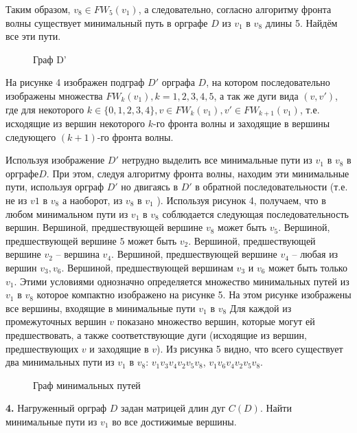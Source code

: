\documentclass[12pt, letterpaper, titlepage]{article}
\begin{document}
Таким образом, $v_8 \in FW_5(v_1)$, а следовательно, согласно алгоритму фронта волны существует минимальный
путь в орграфе $D$ из $v_1$ в $v_8$ длины 5. Найдём все эти пути.
\begin{figure}[H]\centering\caption{Граф D'}\end{figure}
На рисунке 4 изображен подграф $D'$ орграфа $D$, на котором последовательно изображены множества
$FW_k(v_1), k=1,2,3,4,5$, а так же  дуги вида $(v, v')$, где для некоторого $k \in \{0,1,2,3,4\},
    v \in FW_k(v_1), v' \in FW_{k+1}(v_1)$, т.е. исходящие из вершин некоторого $k$-го фронта волны и
заходящие в вершины следующего $(k+1)$-го фронта волны.

Используя изображение $D'$ нетрудно выделить все минимальные пути из $v_1$ в $v_8$
в орграфе$D$. При этом, следуя алгоритму фронта волны, находим эти минимальные пути, используя орграф $D'$
но двигаясь в $D'$ в обратной последовательности (т.е. не из $v1$ в $v_8$ а наоборот, из $v_8$
в $v_1$ ). Используя рисунок 4, получаем, что в любом минимальном пути из $v_1$ в $v_8$
соблюдается следующая последовательность вершин. Вершиной, предшествующей
вершине $v_8$ может быть $v_5$. Вершиной, предшествующей вершине $5$
может быть $v_2$. Вершиной, предшествующей вершине $v_2$ – вершина $v_4$.
Вершиной, предшествующей вершине $v_4$ – любая из вершин $v_3,v_6$.
Вершиной, предшествующей вершинам $v_3$ и $v_6$ может быть только $v_1$. Этими условиями однозначно определяется множество
минимальных путей из $v_1$ в $v_8$ которое компактно изображено на рисунке 5. На этом
рисунке изображены все вершины, входящие в минимальные пути $v_1$ в $v_8$ Для каждой
из промежуточных вершин $v$ показано множество вершин, которые могут ей
предшествовать, а также соответствующие дуги (исходящие из вершин, предшествующих $v$
и заходящие в $v$). Из рисунка 5 видно, что всего существует два минимальных пути из $v_1$ в
$v_8$: $v_1v_3v_4v_2v_5v_8$, $v_1v_6v_4v_2v_5v_8$.
\begin{figure}[H]\centering\caption{Граф минимальных путей}\end{figure}
\newpage
\textbf{4.} Нагруженный орграф $D$ задан матрицей длин дуг $C(D)$. Найти минимальные пути из $v_1$ во все достижимые вершины.
\end{document}
